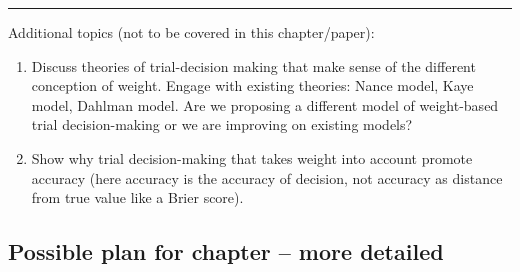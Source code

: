 \documentclass[
  10pt,
  dvipsnames,enabledeprecatedfontcommands]{scrartcl}
\begin{document}
\begin{center}\rule{0.5\linewidth}{0.5pt}\end{center}

Additional topics (not to be covered in this chapter/paper):

\begin{enumerate}
\def\labelenumi{(\arabic{enumi})}
\setcounter{enumi}{3}
\item
  Discuss theories of trial-decision making that make sense of the
  different conception of weight. Engage with existing theories: Nance
  model, Kaye model, Dahlman model. Are we proposing a different model
  of weight-based trial decision-making or we are improving on existing
  models?
\item
  Show why trial decision-making that takes weight into account promote
  accuracy (here accuracy is the accuracy of decision, not accuracy as
  distance from true value like a Brier score).
\end{enumerate}

\hypertarget{possible-plan-for-chapter-more-detailed}{%
\subsection{Possible plan for chapter -- more
detailed}\label{possible-plan-for-chapter-more-detailed}}
\end{document}
